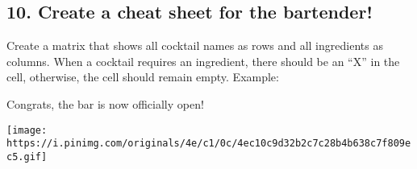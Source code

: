 \documentclass[
]{article}
\begin{document}
\hypertarget{create-a-cheat-sheet-for-the-bartender}{%
\subsection{10. Create a cheat sheet for the
bartender!}\label{create-a-cheat-sheet-for-the-bartender}}

Create a matrix that shows all cocktail names as rows and all
ingredients as columns. When a cocktail requires an ingredient, there
should be an ``X'' in the cell, otherwise, the cell should remain empty.
Example:

Congrats, the bar is now officially open!

\texttt{[image: https://i.pinimg.com/originals/4e/c1/0c/4ec10c9d32b2c7c28b4b638c7f809ec5.gif]}
\end{document}
